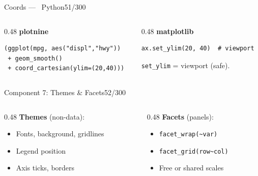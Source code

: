 \documentclass[10pt]{beamer}
\newcommand{\Python}{\textcolor{PyAccent}{\faPython~Python}}
\newcommand{\smark}[1]{\hfill{\scriptsize\color{codegray}#1}}
\begin{document}
\begin{frame}[fragile]{Coords --- \Python}\smark{51/300}
\begin{columns}[T]
\begin{column}{0.48\textwidth}
\centering\textbf{plotnine}\\[0.1cm]
\begin{lstlisting}[style=Pystyle]
(ggplot(mpg, aes("displ","hwy"))
 + geom_smooth()
 + coord_cartesian(ylim=(20,40)))
\end{lstlisting}
\end{column}
\begin{column}{0.48\textwidth}
\centering\textbf{matplotlib}\\[0.1cm]
\begin{lstlisting}[style=Pystyle]
ax.set_ylim(20, 40)  # viewport
\end{lstlisting}
\scriptsize \texttt{set\_ylim} = viewport (safe).
\end{column}
\end{columns}
\end{frame}

\begin{frame}{Component 7: Themes \& Facets}\smark{52/300}
\begin{columns}[T]
\begin{column}{0.48\textwidth}
\textbf{Themes} (non-data):
\begin{itemize}
    \item Fonts, background, gridlines
    \item Legend position
    \item Axis ticks, borders
\end{itemize}
\end{column}
\begin{column}{0.48\textwidth}
\textbf{Facets} (panels):
\begin{itemize}
    \item \texttt{facet\_wrap(\textasciitilde var)}
    \item \texttt{facet\_grid(row\textasciitilde col)}
    \item Free or shared scales
\end{itemize}
\end{column}
\end{columns}
\end{frame}
\end{document}
